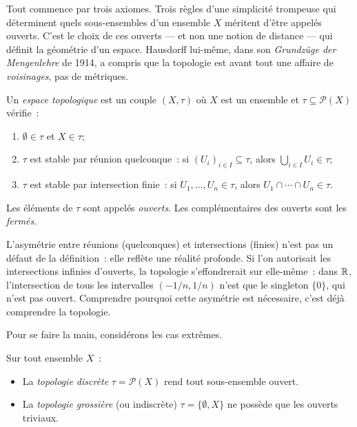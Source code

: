 Tout commence par trois axiomes. Trois r\`egles d'une simplicit\'e trompeuse
qui d\'eterminent quels sous-ensembles d'un ensemble $X$ m\'eritent d'\^etre
appel\'es \og ouverts\fg. C'est le choix de ces ouverts --- et non une notion
de distance --- qui d\'efinit la g\'eom\'etrie d'un espace. Hausdorff
lui-m\^eme, dans son \emph{Grundz\"uge der Mengenlehre} de 1914, a compris que
la topologie est avant tout une affaire de \emph{voisinages}, pas de
m\'etriques.

\begin{definition}
Un \emph{espace topologique} est un couple $(X,\tau)$ o\`u $X$ est un ensemble et
$\tau \subseteq \mathcal{P}(X)$ v\'erifie~:
\begin{enumerate}
  \item $\emptyset \in \tau$ et $X \in \tau$;
  \item $\tau$ est stable par r\'eunion quelconque~: si $(U_i)_{i\in I} \subseteq \tau$,
    alors $\bigcup_{i\in I} U_i \in \tau$;
  \item $\tau$ est stable par intersection finie~: si $U_1,\ldots,U_n \in \tau$, alors
    $U_1 \cap \cdots \cap U_n \in \tau$.
\end{enumerate}
Les \'el\'ements de $\tau$ sont appel\'es \emph{ouverts}. Les compl\'ementaires des ouverts
sont les \emph{ferm\'es}.
\end{definition}

L'asym\'etrie entre r\'eunions (quelconques) et intersections (finies) n'est
pas un d\'efaut de la d\'efinition~: elle refl\`ete une r\'ealit\'e profonde. Si
l'on autorisait les intersections infinies d'ouverts, la topologie
s'effondrerait sur elle-m\^eme~: dans $\mathbb{R}$, l'intersection de tous les
intervalles $(-1/n, 1/n)$ n'est que le singleton $\{0\}$, qui n'est pas
ouvert. Comprendre pourquoi cette asym\'etrie est n\'ecessaire, c'est d\'ej\`a
comprendre la topologie.

Pour se faire la main, consid\'erons les cas extr\^emes.

\begin{exemple}
Sur tout ensemble $X$~:
\begin{itemize}
  \item La \emph{topologie discr\`ete} $\tau = \mathcal{P}(X)$ rend tout sous-ensemble ouvert.
  \item La \emph{topologie grossi\`ere} (ou indiscr\`ete) $\tau = \{\emptyset, X\}$ ne poss\`ede
    que les ouverts triviaux.
\end{itemize}
\end{exemple}

